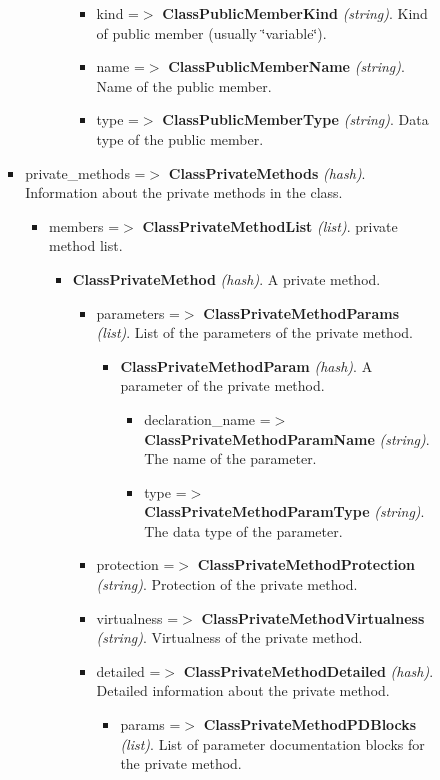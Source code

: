 \begin{itemize}
\begin{itemize}
\begin{itemize}
\begin{itemize}
\begin{itemize}
\begin{itemize}
\begin{itemize}
\item kind =$>$ {\bf ClassPublicMemberKind} {\em (string)\/}. Kind of public member (usually \char`\"{}variable\char`\"{}). \item name =$>$ {\bf ClassPublicMemberName} {\em (string)\/}. Name of the public member. \item type =$>$ {\bf ClassPublicMemberType} {\em (string)\/}. Data type of the public member. \end{itemize}
\end{itemize}
\end{itemize}
\item private\_\-methods =$>$ {\bf ClassPrivateMethods} {\em (hash)\/}. Information about the private methods in the class. \begin{itemize}
\item members =$>$ {\bf ClassPrivateMethodList} {\em (list)\/}. private method list. \begin{itemize}
\item {\bf ClassPrivateMethod} {\em (hash)\/}. A private method. \begin{itemize}
\item parameters =$>$ {\bf ClassPrivateMethodParams} {\em (list)\/}. List of the parameters of the private method. \begin{itemize}
\item {\bf ClassPrivateMethodParam} {\em (hash)\/}. A parameter of the private method. \begin{itemize}
\item declaration\_\-name =$>$ {\bf ClassPrivateMethodParamName} {\em (string)\/}. The name of the parameter. \item type =$>$ {\bf ClassPrivateMethodParamType} {\em (string)\/}. The data type of the parameter. \end{itemize}
\end{itemize}
\item protection =$>$ {\bf ClassPrivateMethodProtection} {\em (string)\/}. Protection of the private method. \item virtualness =$>$ {\bf ClassPrivateMethodVirtualness} {\em (string)\/}. Virtualness of the private method. \item detailed =$>$ {\bf ClassPrivateMethodDetailed} {\em (hash)\/}. Detailed information about the private method. \begin{itemize}
\item params =$>$ {\bf ClassPrivateMethodPDBlocks} {\em (list)\/}. List of parameter documentation blocks for the private method. \begin{itemize}

\end{itemize}
\end{itemize}
\end{itemize}
\end{itemize}
\end{itemize}
\end{itemize}
\end{itemize}
\end{itemize}
\end{itemize}
